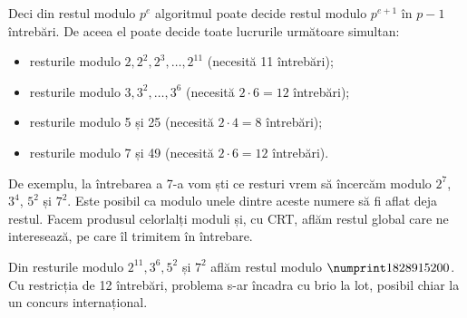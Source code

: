 \documentclass[../main.tex]{subfiles}
\begin{document}
Deci din restul modulo $p^e$ algoritmul poate decide restul modulo $p^{e+1}$ în $p - 1$ întrebări. De aceea el poate decide toate lucrurile următoare simultan:

\begin{itemize}
  \item resturile modulo $2, 2^2, 2^3, \dots, 2^{11}$ (necesită 11 întrebări);
  \item resturile modulo $3, 3^2, \dots, 3^6$ (necesită $2 \cdot 6 = 12$ întrebări);
  \item resturile modulo 5 și 25 (necesită $2 \cdot 4 = 8$ întrebări);
  \item resturile modulo 7 și 49 (necesită $2 \cdot 6 = 12$ întrebări).
\end{itemize}

De exemplu, la întrebarea a 7-a vom ști ce resturi vrem să încercăm modulo $2^7$, $3^4$, $5^2$ și $7^2$. Este posibil ca modulo unele dintre aceste numere să fi aflat deja restul. Facem produsul celorlalți moduli și, cu CRT, aflăm restul global care ne interesează, pe care îl trimitem în întrebare.

Din resturile modulo $2^{11}, 3^6, 5^2$ și $7^2$ aflăm restul modulo $\np{1828915200}$. Cu restricția de 12 întrebări, problema s-ar încadra cu brio la lot, posibil chiar la un concurs internațional.
\end{document}
